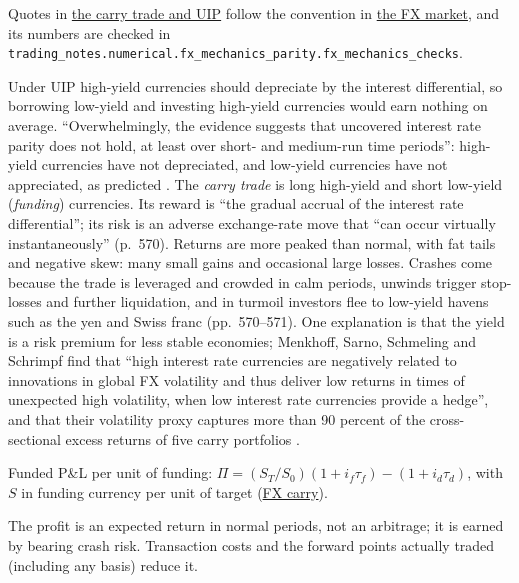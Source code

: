 Quotes in \hyperref[meth:carry-trade-uip]{the carry trade and UIP} follow the convention in \hyperref[def:fx-market-real-exchange-rates]{the FX market}, and its numbers are checked in \nolinkurl{trading_notes.numerical.fx_mechanics_parity.fx_mechanics_checks}.

\begin{qfmethod}\label{meth:carry-trade-uip}
 Under UIP high-yield currencies should depreciate by the interest differential, so borrowing low-yield and investing high-yield currencies would earn nothing on average. ``Overwhelmingly, the evidence suggests that uncovered interest rate parity does not hold, at least over short- and medium-run time periods'': high-yield currencies have not depreciated, and low-yield currencies have not appreciated, as predicted \citep[chap.~10, sec.~4, pp.~569--572]{economics-investment-decision-makers-2013}. The \emph{carry trade} is long high-yield and short low-yield (\emph{funding}) currencies. Its reward is ``the gradual accrual of the interest rate differential''; its risk is an adverse exchange-rate move that ``can occur virtually instantaneously'' (p.~570). Returns are more peaked than normal, with fat tails and negative skew: many small gains and occasional large losses. Crashes come because the trade is leveraged and crowded in calm periods, unwinds trigger stop-losses and further liquidation, and in turmoil investors flee to low-yield havens such as the yen and Swiss franc (pp.~570--571). One explanation is that the yield is a risk premium for less stable economies; Menkhoff, Sarno, Schmeling and Schrimpf find that ``high interest rate currencies are negatively related to innovations in global FX volatility and thus deliver low returns in times of unexpected high volatility, when low interest rate currencies provide a hedge'', and that their volatility proxy captures more than 90 percent of the cross-sectional excess returns of five carry portfolios \citep[abstract]{msss-2012}.

 Funded P\&L per unit of funding: $\Pi=(S_T/S_0)(1+i_f\tau_f)-(1+i_d\tau_d)$, with $S$ in funding currency per unit of target (\hyperref[mod:fx-carry-trade]{FX carry}).

 The profit is an expected return in normal periods, not an arbitrage; it is earned by bearing crash risk. Transaction costs and the forward points actually traded (including any basis) reduce it.


\end{qfmethod}
